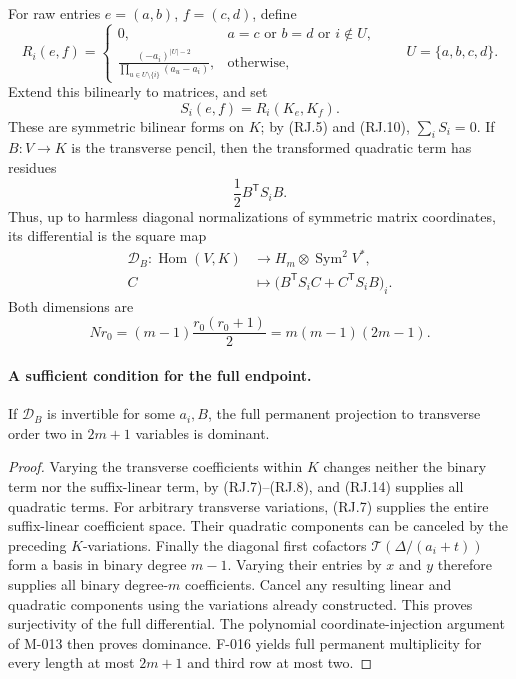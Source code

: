 For raw entries \(e=(a,b)\), \(f=(c,d)\), define
\[
 R_i(e,f)=
 \begin{cases}
  0,&a=c\text{ or }b=d\text{ or }i\notin U,\\[2pt]
  \displaystyle
       \frac{(-a_i)^{|U|-2}}
                 {\prod_{u\in U\setminus\{i\}}(a_u-a_i)},
       &\text{otherwise},
 \end{cases}
 \qquad U=\{a,b,c,d\}.
                                                               \tag{RJ.11}
\]
Extend this bilinearly to matrices, and set
\[
                     S_i(e,f)=R_i(K_e,K_f).
                                                               \tag{RJ.12}
\]
These are symmetric bilinear forms on \(K\);
by (RJ.5) and (RJ.10), \(\sum_iS_i=0\).
If \(B:V\to K\) is the transverse pencil, then the
transformed quadratic term has residues
\[
                         \frac12 B^{\mathsf T}S_iB.
                                                               \tag{RJ.13}
\]
Thus, up to harmless diagonal normalizations of symmetric
matrix coordinates, its differential is the square map
\[
 \begin{split}
 \mathcal D_B:\operatorname{Hom}(V,K)
       &\longrightarrow H_m\otimes\operatorname{Sym}^2V^*,\\
 C&\longmapsto
       \bigl(B^{\mathsf T}S_iC+C^{\mathsf T}S_iB\bigr)_i .
 \end{split}                                                   \tag{RJ.14}
\]
Both dimensions are
\[
 Nr_0=(m-1)\frac{r_0(r_0+1)}2=m(m-1)(2m-1).
                                                               \tag{RJ.15}
\]

\paragraph{A sufficient condition for the full endpoint.}
If \(\mathcal D_B\) is invertible for some \(a_i,B\),
the full permanent projection to transverse order two
in \(2m+1\) variables is dominant.

\begin{proof}
Varying the transverse coefficients within \(K\) changes
neither the binary term nor the suffix-linear term, by
(RJ.7)--(RJ.8), and (RJ.14) supplies all quadratic terms.
For arbitrary transverse variations, (RJ.7) supplies the
entire suffix-linear coefficient space. Their quadratic
components can be canceled by the preceding \(K\)-variations.
Finally the diagonal first cofactors
\(\mathcal T(\Delta/(a_i+t))\) form a basis in binary
degree \(m-1\). Varying their entries by \(x\) and \(y\)
therefore supplies all binary degree-\(m\) coefficients.
Cancel any resulting linear and quadratic components
using the variations already constructed.
This proves surjectivity of the full differential.
The polynomial coordinate-injection argument of M-013
then proves dominance. F-016 yields full permanent
multiplicity for every length at most \(2m+1\) and
third row at most two.
\end{proof}

